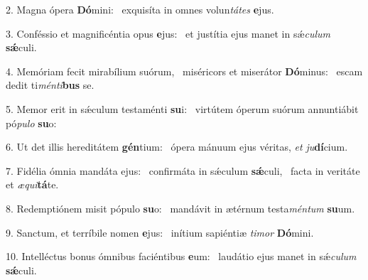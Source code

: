 2. Magna ópera \textbf{Dó}mini: \ast\  exquisíta in omnes volun\textit{tá}\textit{tes} \textbf{e}jus.\

3. Conféssio et magnificéntia opus \textbf{e}jus: \ast\  et justítia ejus manet in sǽ\textit{cu}\textit{lum} \textbf{sǽ}culi.\

4. Memóriam fecit mirabílium suórum, \dag\  miséricors et miserátor \textbf{Dó}minus: \ast\  escam dedit ti\textit{mén}\textit{ti}\textbf{bus} se.\

5. Memor erit in sǽculum testaménti \textbf{su}i: \ast\  virtútem óperum suórum annuntiábit pó\textit{pu}\textit{lo} \textbf{su}o:\

6. Ut det illis hereditátem \textbf{gén}tium: \ast\  ópera mánuum ejus véritas, \textit{et} \textit{ju}\textbf{dí}cium.\

7. Fidélia ómnia mandáta ejus: \dag\  confirmáta in sǽculum \textbf{sǽ}culi, \ast\  facta in veritáte et \textit{æ}\textit{qui}\textbf{tá}te.\

8. Redemptiónem misit pópulo \textbf{su}o: \ast\  mandávit in ætérnum testa\textit{mén}\textit{tum} \textbf{su}um.\

9. Sanctum, et terríbile nomen \textbf{e}jus: \ast\  inítium sapiéntiæ \textit{ti}\textit{mor} \textbf{Dó}mini.\

10. Intelléctus bonus ómnibus faciéntibus \textbf{e}um: \ast\  laudátio ejus manet in sǽ\textit{cu}\textit{lum} \textbf{sǽ}culi.\

